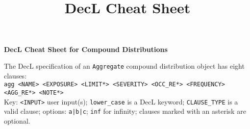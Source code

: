 


%
%
%

% 
\title{DecL Cheat Sheet}






{\huge{\bf DecL Cheat Sheet for Compound Distributions}}

\raggedright The DecL specification of an \texttt{Aggregate} compound distribution object has eight clauses: \\
\texttt{agg <NAME> <EXPOSURE> <LIMIT*> <SEVERITY> <OCC\_RE*> <FREQUENCY> <AGG\_RE*> <NOTE*>} \\
Key: \texttt{<INPUT>} user input(s); \texttt{lower\_case} is a DecL keyword; \texttt{CLAUSE\_TYPE} is a valid clause; options: \texttt{a|b|c}; \texttt{inf} for infinity; clauses marked with an asterisk are optional.

